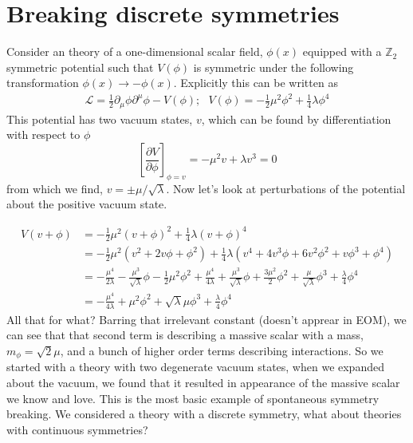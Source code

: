 \section{Breaking discrete symmetries}
Consider an theory of a one-dimensional scalar field, $\phi(x)$ equipped with a $\mathbb{Z}_{2}$ symmetric potential such that $V(\phi)$ is symmetric under the following transformation $\phi(x)\rightarrow -\phi(x)$. Explicitly this can be written as
\begin{equation}
    \begin{split}
        \mathcal{L} = \frac{1}{2}\partial_{\mu}\phi\partial^{\mu}\phi - V(\phi); \ \ \ V(\phi) = -\frac{1}{2}\mu^2\phi^2 +\frac{1}{4}\lambda\phi^4
    \end{split}
\end{equation}
This potential has two vacuum states, $v$, which can be found by differentiation with respect to $\phi$
\begin{equation}
    \left[\frac{\partial V}{\partial\phi}\right]_{\phi=v} = -\mu^2v + \lambda v^3 = 0
\end{equation}
from which we find, $v = \pm\mu/\sqrt{\lambda}$. Now let's look at perturbations of the potential about the positive vacuum state. 

\begin{equation}
    \begin{split}
        V(v + \phi) &= -\frac{1}{2}\mu^2(v + \phi)^2 +\frac{1}{4}\lambda(v + \phi)^4\\
        &=-\frac{1}{2}\mu^2(v^2 + 2v\phi + \phi^2) +\frac{1}{4}\lambda(v^4 + 4v^3\phi + 6v^2\phi^2 + v\phi^3 + \phi^4)\\
        &= -\frac{\mu^4}{2\lambda} - \frac{\mu^3}{\sqrt{\lambda}}\phi -\frac{1}{2}\mu^2\phi^2 +\frac{\mu^4}{4\lambda} + \frac{\mu^3}{\sqrt{\lambda}}\phi + \frac{3\mu^2}{2}\phi^2 + \frac{\mu}{\sqrt{\lambda}}\phi^3 + \frac{\lambda}{4}\phi^4\\
        &=-\frac{\mu^4}{4\lambda} +\mu^2\phi^2 + \sqrt{\lambda}\mu\phi^3 + \frac{\lambda}{4}\phi^4
    \end{split}
\end{equation}
All that for what? Barring that irrelevant constant (doesn't apprear in EOM), we can see that that second term is describing a massive scalar with a mass, $m_{\phi} = \sqrt{2}\mu$, and a bunch of higher order terms describing interactions. So we started with a theory with two degenerate vacuum states, when we expanded about the vacuum, we found that it resulted in appearance of the massive scalar we know and love. This is the most basic example of spontaneous symmetry breaking. We considered a theory with a discrete symmetry, what about theories with continuous symmetries?

